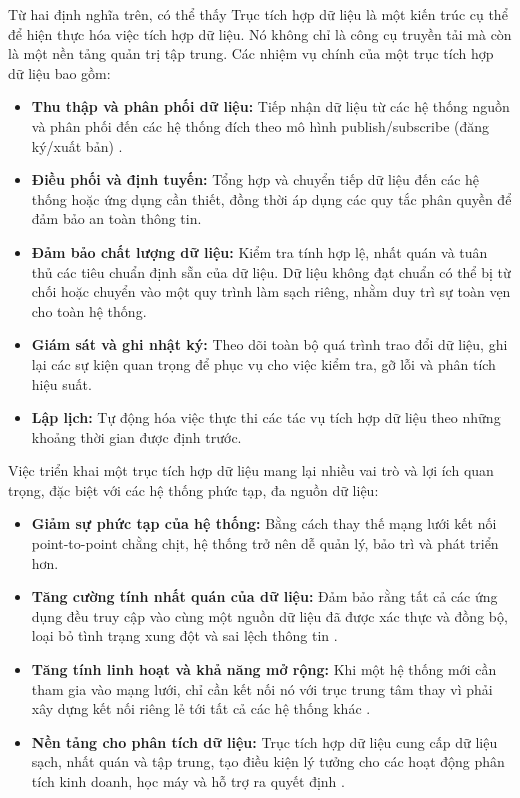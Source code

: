 Từ hai định nghĩa trên, có thể thấy Trục tích hợp dữ liệu là một kiến trúc cụ thể để hiện thực hóa việc tích hợp dữ liệu. Nó không chỉ là công cụ truyền tải mà còn là một nền tảng quản trị tập trung. Các nhiệm vụ chính của một trục tích hợp dữ liệu bao gồm:

\begin{itemize}
    \item \textbf{Thu thập và phân phối dữ liệu:} Tiếp nhận dữ liệu từ các hệ thống nguồn và phân phối đến các hệ thống đích theo mô hình publish/subscribe (đăng ký/xuất bản) \cite{microsoft:pubsub, confluent:pubsub}.
    \item \textbf{Điều phối và định tuyến:} Tổng hợp và chuyển tiếp dữ liệu đến các hệ thống hoặc ứng dụng cần thiết, đồng thời áp dụng các quy tắc phân quyền để đảm bảo an toàn thông tin.
    \item \textbf{Đảm bảo chất lượng dữ liệu:} Kiểm tra tính hợp lệ, nhất quán và tuân thủ các tiêu chuẩn định sẵn của dữ liệu. Dữ liệu không đạt chuẩn có thể bị từ chối hoặc chuyển vào một quy trình làm sạch riêng, nhằm duy trì sự toàn vẹn cho toàn hệ thống.
    \item \textbf{Giám sát và ghi nhật ký:} Theo dõi toàn bộ quá trình trao đổi dữ liệu, ghi lại các sự kiện quan trọng để phục vụ cho việc kiểm tra, gỡ lỗi và phân tích hiệu suất.
    \item \textbf{Lập lịch:} Tự động hóa việc thực thi các tác vụ tích hợp dữ liệu theo những khoảng thời gian được định trước.
\end{itemize}

Việc triển khai một trục tích hợp dữ liệu mang lại nhiều vai trò và lợi ích quan trọng, đặc biệt với các hệ thống phức tạp, đa nguồn dữ liệu:

\begin{itemize}
    \item \textbf{Giảm sự phức tạp của hệ thống:} Bằng cách thay thế mạng lưới kết nối point-to-point chằng chịt, hệ thống trở nên dễ quản lý, bảo trì và phát triển hơn.
    \item \textbf{Tăng cường tính nhất quán của dữ liệu:} Đảm bảo rằng tất cả các ứng dụng đều truy cập vào cùng một nguồn dữ liệu đã được xác thực và đồng bộ, loại bỏ tình trạng xung đột và sai lệch thông tin \cite{microsoft:pubsub, gartner:data_consistency}.
    \item \textbf{Tăng tính linh hoạt và khả năng mở rộng:} Khi một hệ thống mới cần tham gia vào mạng lưới, chỉ cần kết nối nó với trục trung tâm thay vì phải xây dựng kết nối riêng lẻ tới tất cả các hệ thống khác \cite{confluent:pubsub}.
    \item \textbf{Nền tảng cho phân tích dữ liệu:} Trục tích hợp dữ liệu cung cấp dữ liệu sạch, nhất quán và tập trung, tạo điều kiện lý tưởng cho các hoạt động phân tích kinh doanh, học máy và hỗ trợ ra quyết định \cite{informatica:whatisdih,ibm:bi_from_di}.
\end{itemize}

